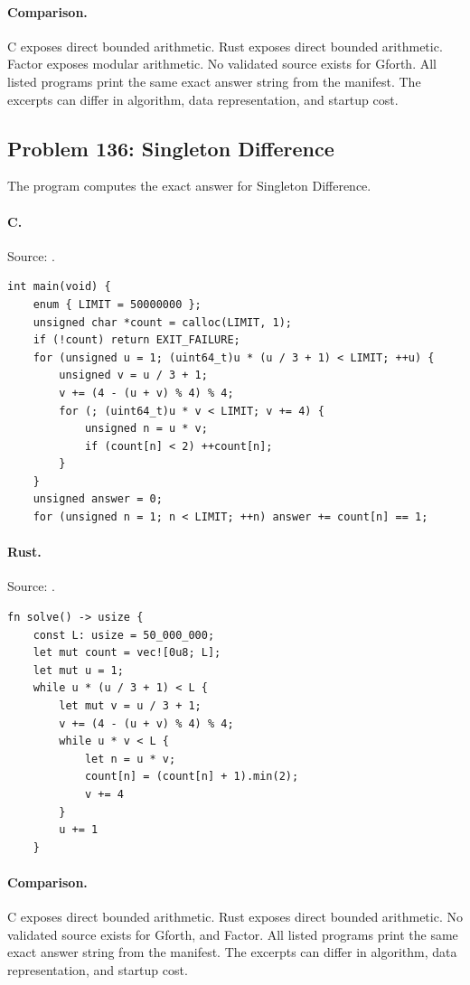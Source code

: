 \paragraph{Comparison.}
C exposes direct bounded arithmetic. Rust exposes direct bounded arithmetic. Factor exposes modular arithmetic.
No validated source exists for Gforth.
All listed programs print the same exact answer string from the manifest. The excerpts can differ in algorithm, data representation, and startup cost.

\subsection{Problem 136: Singleton Difference}
\label{walkthrough:p136}
The program computes the exact answer for Singleton Difference.

\paragraph{C.} Source: .
\begin{lstlisting}
int main(void) {
    enum { LIMIT = 50000000 };
    unsigned char *count = calloc(LIMIT, 1);
    if (!count) return EXIT_FAILURE;
    for (unsigned u = 1; (uint64_t)u * (u / 3 + 1) < LIMIT; ++u) {
        unsigned v = u / 3 + 1;
        v += (4 - (u + v) % 4) % 4;
        for (; (uint64_t)u * v < LIMIT; v += 4) {
            unsigned n = u * v;
            if (count[n] < 2) ++count[n];
        }
    }
    unsigned answer = 0;
    for (unsigned n = 1; n < LIMIT; ++n) answer += count[n] == 1;
\end{lstlisting}

\paragraph{Rust.} Source: .
\begin{lstlisting}
fn solve() -> usize {
    const L: usize = 50_000_000;
    let mut count = vec![0u8; L];
    let mut u = 1;
    while u * (u / 3 + 1) < L {
        let mut v = u / 3 + 1;
        v += (4 - (u + v) % 4) % 4;
        while u * v < L {
            let n = u * v;
            count[n] = (count[n] + 1).min(2);
            v += 4
        }
        u += 1
    }
\end{lstlisting}

\paragraph{Comparison.}
C exposes direct bounded arithmetic. Rust exposes direct bounded arithmetic.
No validated source exists for Gforth, and Factor.
All listed programs print the same exact answer string from the manifest. The excerpts can differ in algorithm, data representation, and startup cost.

